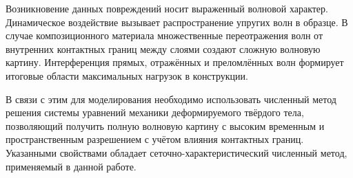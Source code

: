 Возникновение данных повреждений носит выраженный волновой характер. 
Динамическое воздействие вызывает распространение упругих волн в образце. В случае 
композиционного материала множественные переотражения волн от внутренних контактных 
границ между слоями создают сложную волновую картину. Интерференция прямых, отражённых 
и преломлённых волн формирует итоговые области максимальных нагрузок в конструкции.

В связи с этим для моделирования необходимо использовать численный метод решения системы 
уравнений механики деформируемого твёрдого тела, позволяющий получить полную волновую 
картину с высоким временным и пространственным разрешением с учётом влияния контактных 
границ. Указанными свойствами обладает сеточно-характеристический численный метод, 
применяемый в данной работе.
